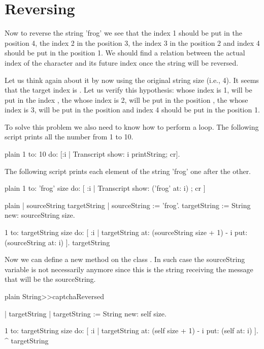 \documentclass[10pt,twoside,english]{_support/latex/sbabook/sbabook}
\begin{document}
\section{Reversing}
Now to reverse the string 'frog' we see that the  index 1 should be put in the position 4, the  index 2 in the position 3, the  index 3 in the position 2 and  index 4 should be put in the position 1. We should find a relation between the actual index of the character and its future index once the string will be reversed. 

Let us think again about it by now using the original string size (i.e., 4).  It seems that the target index is . Let us verify this hypothesis:   whose index is 1, will be put in the index , the  whose index is 2, will be put in the position , the  whose index is 3, will be put  in the position  and  index 4 should be put in the position 1. 

To solve this problem we also need to know how to perform a loop. The following script prints all the number from 1 to 10. 

\begin{displaycode}{plain}
1 to: 10 do: [:i | Transcript show: i printString; cr].
\end{displaycode}

The following script prints each element of the string 'frog' one after the other. 

\begin{displaycode}{plain}
1 
	to: 'frog' size 
	do: [ :i | Transcript show: ('frog' at: i) ; cr ]
\end{displaycode}

\begin{displaycode}{plain}
| sourceString targetString |
sourceString := 'frog'.
targetString := String new: sourceString size.

1 to: targetString size do: [ :i | 
	targetString at: (sourceString size + 1) - i put: (sourceString at: i)
	].
targetString
\end{displaycode}

Now we can define a new method on the class . In such case the sourceString variable is not necessarily anymore since this is the string receiving the message that will be the sourceString. 

\begin{displaycode}{plain}
String>>captchaReversed

	| targetString |
	targetString := String new: self size.

	1 to: targetString size do: [ :i | 
		targetString at: (self size + 1) - i put: (self at: i)
		].
	^ targetString
\end{displaycode}
\end{document}
